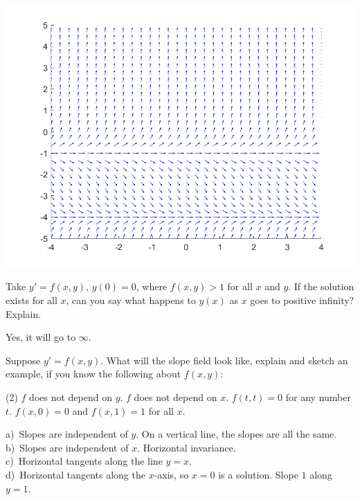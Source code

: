 \begin{minipage}{0.32\textwidth}
\includegraphics[width=\textwidth]{Images/yprimeyp1yp4slope}
\end{minipage}

\begin{exercise}[challenging]
Take $y' = f(x,y)$, $y(0) = 0$, where $f(x,y) > 1$
for all $x$ and $y$.  If
the solution exists for all $x$, can you say
what happens to $y(x)$ as $x$ goes to positive infinity?  Explain.
\end{exercise}
\comboSol{%
}
{%
Yes, it will go to $\infty$.
}

\begin{exercise}
Suppose $y' = f(x,y)$.  What will the slope field look like, explain and
sketch an example, if you know the following about $f(x,y)$:
\begin{tasks}(2)
\task $f$ does
not depend on $y$.
\task $f$ does not depend on $x$.
\task $f(t,t) = 0$ for any
number $t$.
\task $f(x,0) = 0$ and $f(x,1) = 1$ for all $x$.
\end{tasks}
\end{exercise}
\comboSol{%
}
{%
a)~Slopes are independent of $y$. On a vertical line, the slopes are all the same. \\
b)~Slopes are independent of $x$. Horizontal invariance. \\
c)~Horizontal tangents along the line $y=x$.\\
d)~Horizontal tangents along the $x$-axis, so $x=0$ is a solution. Slope $1$ along $y=1$. 
}

